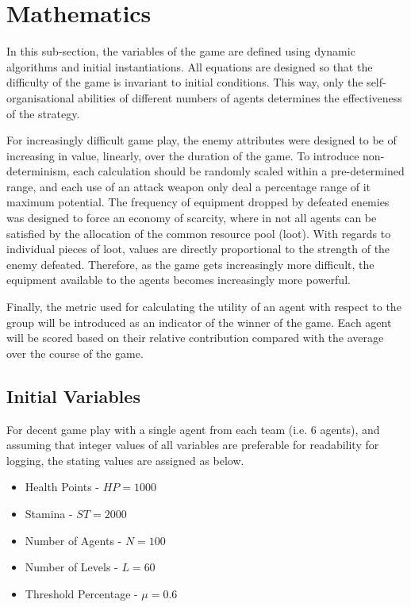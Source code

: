 \clearpage

\section{Mathematics}\label{sec: maths}

In this sub-section, the variables of the game are defined using dynamic algorithms and initial instantiations. All equations are designed so that the difficulty of the game is invariant to initial conditions. This way, only the self-organisational abilities of different numbers of agents determines the effectiveness of the strategy. 

For increasingly difficult game play, the enemy attributes were designed to be of increasing in value, linearly, over the duration of the game. To introduce non-determinism, each calculation should be randomly scaled within a pre-determined range, and each use of an attack weapon only deal a percentage range of it maximum potential. The frequency of equipment dropped by defeated enemies was designed to force an economy of scarcity, where in not all agents can be satisfied by the allocation of the common resource pool (loot). With regards to individual pieces of loot, values are directly proportional to the strength of the enemy defeated. Therefore, as the game gets increasingly more difficult, the equipment available to the agents becomes increasingly more powerful.  

Finally, the metric used for calculating the utility of an agent with respect to the group will be introduced as an indicator of the winner of the game. Each agent will be scored based on their relative contribution compared with the average over the course of the game. 

\subsection{Initial Variables}\label{sec: initial variable}

For decent game play with a single agent from each team (i.e. 6 agents), and assuming that integer values of all variables are preferable for readability for logging, the stating values are assigned as below. 

\begin{itemize}
    \item Health Points - $HP = 1000$
    \item Stamina - $ST = 2000$
    \item Number of Agents - $N = 100$
    \item Number of Levels - $L = 60$
    \item Threshold Percentage - $\mu = 0.6$
\end{itemize}

